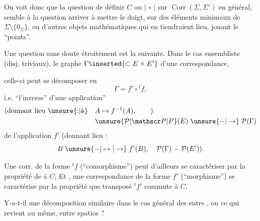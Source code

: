 On voit donc que la question de définir $C$ ou $\mathrel{|\,\circ\,|}$ sur $\operatorname{Corr}(\Sigma,\Sigma')$ en général, semble  à la question arriver à mettre le doigt,  sur des éléments minimaux de $\Sigma\setminus\{0_{\Sigma}\}$, ou d'autres objets mathématiques qui en tiendraient lieu, jouant le   ``points''.

Une question sans doute étroitement  est la suivante. Dans le cas ensembliste (disj. triviaux),  le graphe $\Gamma\inserted{\subset E\times E'}$ d'une correspondance, 


celle-ci peut se décomposer en
\[
\Gamma=f'\circ{}^{t}f,
\]
i.e. ``l'inverse'' d'une application'' 
\[
\begin{aligned}
\text{(donnant lieu \unsure{:|à}} &\quad A\mapsto f^{-1}(A),\qquad\text{)}\\
&\quad \unsure{\mathcal P|\mathscr P|P}(E)\mathrel{\unsure{-|\to}}\mathcal P(\Gamma)
\end{aligned}
\]
 de l'application $f'$ (donnant lieu :
\[
B\mathrel{\unsure{-|\mapsto|\to}}f'(B),\quad
\mathcal P(\Gamma)\mathrel{-}\mathcal P(E')\text{).}
\]

Une corr. de la forme $ {}^{t}f$  (``comorphisme'') peut d'ailleurs se caractériser  par la propriété de  à $C$; Et , une correspondance de la forme $f'$ (``morphisme'') se caractérise par la propriété que  transposé $ {}^{t}f'$ commute à $C$.

Y-a-t-il une décomposition similaire dans le cas général des   entre , ou ce qui revient au même, entre spatios ?
